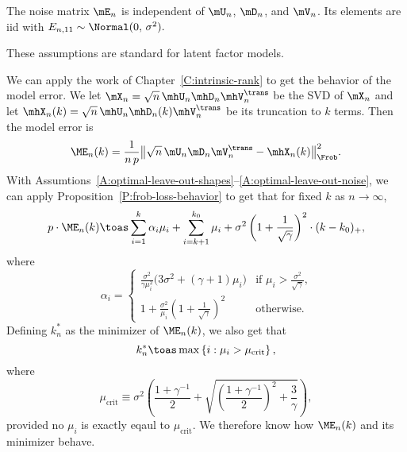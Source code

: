 \begin{assumption}\label{A:optimal-leave-out-noise}
    The noise matrix $\mE_n$ is independent of $\mU_n$, $\mD_n$, and $\mV_n$.
    Its elements are iid with 
    \(
        E_{n,11} \sim \Normal( 0, \, \sigma^2 ).
    \)
\end{assumption}

\noindent
These assumptions are standard for latent factor models.

We can apply the work of
Chapter~\ref{C:intrinsic-rank} to get the behavior of the model error.
    We
let $\mX_n = \sqrt{n} \, \mhU_n \mhD_n \mhV_n^\trans$ be the SVD of $\mX_n$ and let $\mhX_n(k) = \sqrt{n} \, \mhU_n \mhD_n(k) \mhV_n^\trans$ be its truncation to $k$ terms.  Then the model error is
\begin{equation}
    {\ME}_n (k)
        = 
            \frac{1}{n \, p} 
            \big\| 
                \sqrt{n} \, \mU_n \mD_n \mV_n^\trans 
                - 
                \mhX_n(k)
            \big\|_\Frob^2.
\end{equation}
With Assumtions~\ref{A:optimal-leave-out-shapes}--\ref{A:optimal-leave-out-noise}, we can apply Proposition~\ref{P:frob-loss-behavior} to get that for fixed
$k$ as $n \to \infty$,
\begin{equation}
    p \cdot {\ME}_n (k)
        \toas
        \sum_{i=1}^{k}
            \alpha_i \mu_i
        +
        \sum_{i=k+1}^{k_0}
            \mu_i
        +
        \sigma^2
        \left(
            1 + \frac{1}{\sqrt{\gamma}}
        \right)^2
        \cdot
        (k - k_0)_+,
\end{equation}
where
\begin{equation}\label{E:bcv-theory-alpha}
    \alpha_i 
    =
    \begin{cases}
        \frac{\sigma^2}{\gamma \mu_i^2}
                \big(
                    3 \sigma^2 + (\gamma+1) \mu_i
                \big)
            &\text{if $\mu_i > \frac{\sigma^2}{\sqrt{\gamma}}$,} \\
        1 
        + 
        \frac{\sigma^2}{\mu_i}
        \left(
            1
            +
            \frac{1}{\sqrt{\gamma}}
        \right)^2
            &\text{otherwise.}
    \end{cases}
\end{equation}
Defining $k_n^\ast$ as the minimizer of ${\ME}_n(k)$, we also get that
\begin{equation}
    k_n^\ast
        \toas
            \max \left\{ i : \mu_i > \mu_\text{crit} \right\},
\end{equation}
where
\begin{equation}
    \mu_\text{crit}
    \equiv
    \sigma^2
    \left(
    \frac{1 + \gamma^{-1}}{2}
    +
    \sqrt{ 
        \left( \frac{1 + \gamma^{-1} }{2} \right)^2
        +
        \frac{3}{\gamma}
    }
    \right),
\end{equation}
provided no $\mu_i$ is exactly eqaul to $\mu_\text{crit}$.  We therefore know
how ${\ME}_n(k)$ and its minimizer behave.

